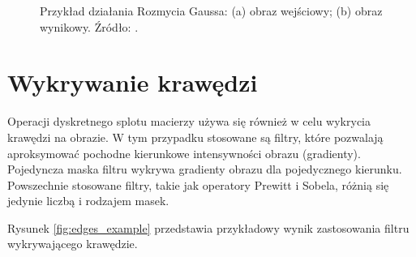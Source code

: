 \documentclass[a4paper,twocolumn,12pt]{article}
\begin{document}
\begin{figure}[!ht]
 \begin{center}
 \end{center}
 \caption{
  Przykład działania Rozmycia Gaussa:
  (a) obraz wejściowy;
  (b) obraz wynikowy.
  Źródło: \cite{gauss}.
 }
 \label{fig:gauss_example}
\end{figure}



\section{Wykrywanie krawędzi} \label{sec:edge_detection}

Operacji dyskretnego splotu macierzy używa się również w celu wykrycia krawędzi na obrazie.
W tym przypadku stosowane są filtry, które pozwalają aproksymować pochodne kierunkowe intensywności obrazu (gradienty).
Pojedyncza maska filtru wykrywa gradienty obrazu dla pojedycznego kierunku.
Powszechnie stosowane filtry, takie jak operatory Prewitt i Sobela, różnią się jedynie liczbą i rodzajem masek.

Rysunek \ref{fig:edges_example} przedstawia przykładowy wynik zastosowania filtru wykrywającego krawędzie.
\end{document}
